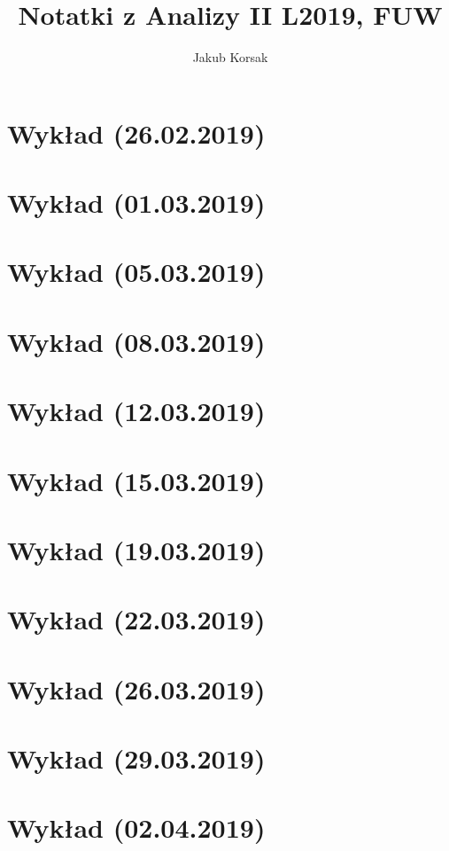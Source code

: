 \documentclass[a5paper]{article}
\title{Notatki z Analizy II L2019, FUW}
\author{Jakub Korsak}
\begin{document}
\maketitle

\pagebreak
\section{Wykład (26.02.2019)}

\pagebreak
\section{Wykład (01.03.2019)}

\pagebreak
\section{Wykład (05.03.2019)}

\pagebreak
\section{Wykład (08.03.2019)}

\pagebreak
\section{Wykład (12.03.2019)}

\pagebreak
\section{Wykład (15.03.2019)}

\pagebreak
\section{Wykład (19.03.2019)}

\pagebreak
\section{Wykład (22.03.2019)}

\pagebreak
\section{Wykład (26.03.2019)}

\pagebreak
\section{Wykład (29.03.2019)}

\pagebreak
\section{Wykład (02.04.2019)}

\pagebreak
\end{document}
